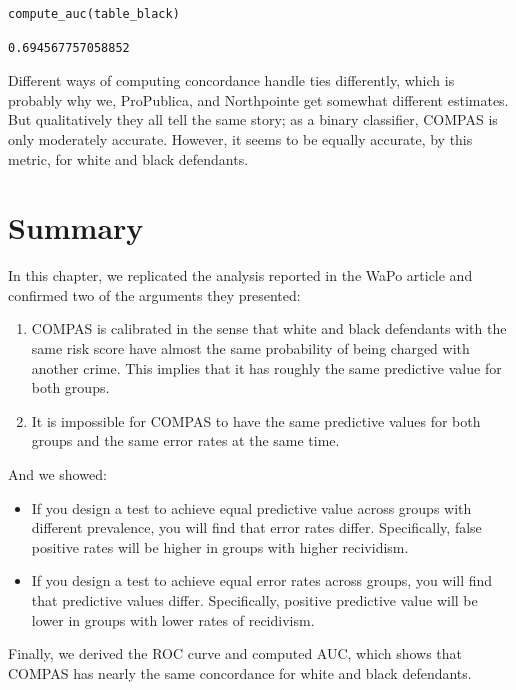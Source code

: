 \begin{lstlisting}[language=Python,style=source]
compute_auc(table_black)
\end{lstlisting}

\begin{lstlisting}[style=output]
0.694567757058852
\end{lstlisting}

Different ways of computing concordance handle ties differently, which
is probably why we, ProPublica, and Northpointe get somewhat different
estimates. But qualitatively they all tell the same story; as a binary
classifier, COMPAS is only moderately accurate. However, it seems to be
equally accurate, by this metric, for white and black defendants.

\hypertarget{summary}{%
\section{Summary}\label{summary}}

In this chapter, we replicated the analysis reported in the WaPo article
and confirmed two of the arguments they presented:

\begin{enumerate}
\def\labelenumi{\arabic{enumi}.}
\item
  COMPAS is calibrated in the sense that white and black defendants with
  the same risk score have almost the same probability of being charged
  with another crime. This implies that it has roughly the same
  predictive value for both groups.
\item
  It is impossible for COMPAS to have the same predictive values for
  both groups and the same error rates at the same time.
\end{enumerate}

And we showed:

\begin{itemize}
\item
  If you design a test to achieve equal predictive value across groups
  with different prevalence, you will find that error rates differ.
  Specifically, false positive rates will be higher in groups with
  higher recividism.
\item
  If you design a test to achieve equal error rates across groups, you
  will find that predictive values differ. Specifically, positive
  predictive value will be lower in groups with lower rates of
  recidivism.
\end{itemize}

Finally, we derived the ROC curve and computed AUC, which shows that
COMPAS has nearly the same concordance for white and black defendants.

